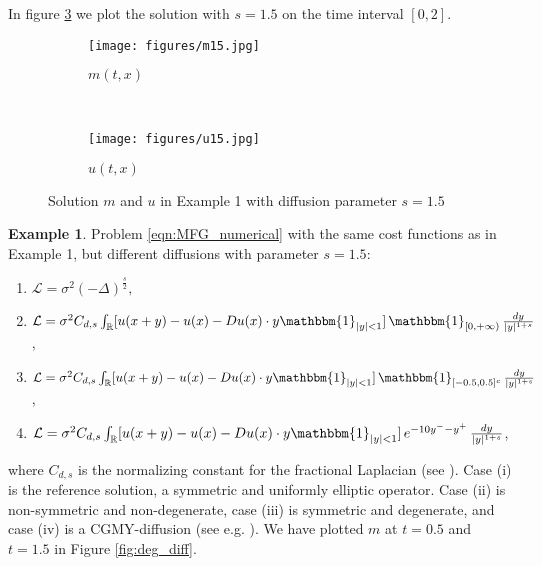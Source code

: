 \documentclass[a4paper,  twoside, 10pt, leqno]{amsart}
\theoremstyle{remark}
\theoremstyle{definition}
\newtheorem{example}{Example}
\begin{document}
In figure \ref{fig:s_15} we plot the solution with $s=1.5$ on 
the time interval $[ 0,2 ]$.


\begin{figure}[ht!]
    \centering
    \begin{subfigure}[b]{0.49\textwidth}
        \texttt{[image: figures/m15.jpg]}
        \caption{$m ( t,x )$}
        \label{fig:ex1m15}
    \end{subfigure}
    ~ %
    \begin{subfigure}[b]{0.49\textwidth}
        \texttt{[image: figures/u15.jpg]}
        \caption{$u(t,x)$}
        \label{fig:ex1u15}
    \end{subfigure}
    \caption{Solution $m$ and $u$ in Example 1 with diffusion parameter $s=1.5$} 
    \label{fig:s_15}
\end{figure}



\begin{example}\label{ex2}
Problem \eqref{eqn:MFG_numerical} with the same cost functions as in Example 1, but  different diffusions with parameter
$s=1.5$:

\begin{enumerate}
\item $\mathcal{L} = \sigma^2 ( - \Delta )^{\frac{s}{2}},$
\item $\mathcal{L} =  \sigma^2 C_{d,s} \int_{\mathbb{R}} [   u ( x+y ) - u ( x ) - Du ( x ) \cdot y \mathbbm{1}_{|y|<1} ] \, \mathbbm{1}_{ [ 0, + \infty )}    \, \frac{dy}{|y|^{1+s}}$,  
\item $ \mathcal{L} = \sigma^2 C_{d,s} \int_{\mathbb{R}} [   u ( x+y ) - u ( x ) - Du ( x ) \cdot y \mathbbm{1}_{|y|<1} ] \, \mathbbm{1}_{ [ -0.5,0.5 ]^{c}} \, \frac{dy}{|y|^{1+s}}$,
\item $\mathcal{L} = \sigma^2 C_{d,s} \int_{\mathbb{R}} [   u ( x+y ) - u ( x ) - Du ( x ) \cdot y \mathbbm{1}_{|y|<1} ] \, e^{-10 y^{-} -y^{+}} \,  \frac{dy}{|y|^{1+s}}  $,
\end{enumerate}
where $C_{d,s}$ is the normalizing constant for the fractional Laplacian (see \cite{huang2014numerical}).
Case (i) is the reference solution, a symmetric and uniformly elliptic operator.  Case (ii) is non-symmetric and non-degenerate,  case (iii) is symmetric and degenerate, and case (iv) is a CGMY-diffusion (see e.g. \cite{tankov2003financial}). We have plotted $m$ at $t=0.5$ and  $t=1.5$ in Figure \ref{fig:deg_diff}.  
\end{example}
\end{document}
